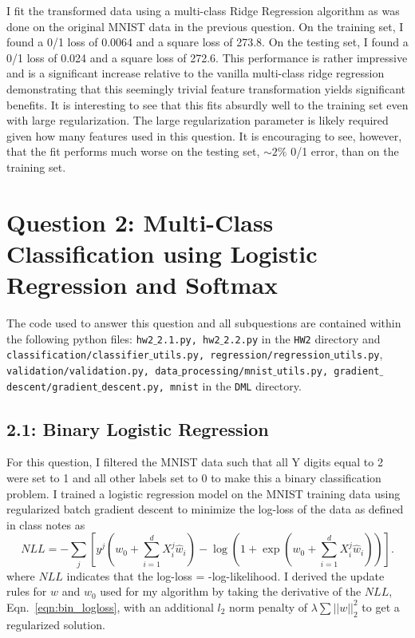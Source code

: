 \documentclass[12pt]{amsart}
\begin{document}
I fit the transformed data using a multi-class Ridge Regression algorithm as was done on the original MNIST data in the previous question.  On the training set, I found a 0/1 loss of 0.0064 and a square loss of 273.8.  On the testing set, I found a 0/1 loss of 0.024 and a square loss of 272.6.  This performance is rather impressive and is a significant increase relative to the vanilla multi-class ridge regression demonstrating that this seemingly trivial feature transformation yields significant benefits.  It is interesting to see that this fits absurdly well to the training set even with large regularization.  The large regularization parameter is likely required given how many features used in this question.  It is encouraging to see, however, that the fit performs much worse on the testing set, ${\sim}2\%$ 0/1 error, than on the training set. 

\section*{Question 2: Multi-Class Classification using Logistic Regression and Softmax}

The code used to answer this question and all subquestions are contained within the following python files: {\tt hw2$\_$2.1.py, hw2$\_$2.2.py} in the {\tt HW2} directory and {\tt classification/classifier$\_$utils.py, regression/regression$\_$utils.py},
 {\tt validation/validation.py, data$\_$processing/mnist$\_$utils.py, gradient$\_$descent/gradient$\_$descent.py, mnist} in the {\tt DML} directory.

\subsection*{2.1: Binary Logistic Regression}

For this question, I filtered the MNIST data such that all Y digits equal to 2 were set to 1 and all other labels set to 0 to make this a binary classification problem.  I trained a logistic regression model on the MNIST training data using regularized batch gradient descent to minimize the log-loss of the data as defined in class notes as
\begin{equation} \label{eqn:bin_logloss}
NLL = -\sum_j [y^j (w_0 + \sum_{i=1}^d X_i^j \hat{w}_i) - \log(1+ \exp(w_0 + \sum_{i=1}^d X_i^j \hat{w}_i))].
\end{equation}
where $NLL$ indicates that the log-loss = -log-likelihood.  I derived the update rules for $w$ and $w_0$ used for my algorithm by taking the derivative of the $NLL$, Eqn.~\ref{eqn:bin_logloss}, with an additional $l_2$ norm penalty of $\lambda \sum||w||^2_2$ to get a regularized solution.  
\end{document}
